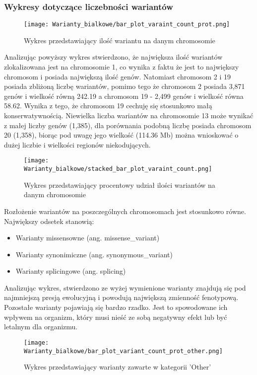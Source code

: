 \documentclass[12pt]{article}
\begin{document}
\subsubsection{Wykresy dotyczące liczebności wariantów}

\begin{figure}[H]
    \texttt{[image: Warianty\_bialkowe/bar\_plot\_varaint\_count\_prot.png]}
    \caption{Wykres przedstawiający ilość wariantu na danym chromosomie}
\end{figure}
\indent
\indent Analizując powyższy wykres stwierdzono, że największa ilość wariantów zlokalizowana jest na chromosomie 1, co wynika z faktu że jest to największy chromosom i posiada największą ilość genów. Natomiast chromosom 2 i 19 posiada zbliżoną liczbę wariantów, pomimo tego że chromosom 2 posiada 3,871 genów i wielkość równą 242.19 a chromosom 19 - 2,499 genów i wielkość równa 58.62. Wynika z tego, że chromosom 19 cechuję się stosunkowo małą konserwatywnością. Niewielka liczba wariantów na chromosomie 13 może wynikać z małej liczby genów (1,385), dla porównania podobną liczbę posiada chromosom 20 (1,358), biorąc pod uwagę jego wielkość (114.36 Mb) można wnioskować o dużej liczbie i wielkości regionów niekodujących. 

\begin{figure}[H]
    \texttt{[image: Warianty\_bialkowe/stacked\_bar\_plot\_varaint\_count.png]}
    \caption{Wykres przedstawiający procentowy udział ilości wariantów na danym chromosomie}
\end{figure}
\indent
\indent Rozłożenie wariantów na poszczególnych chromosomach jest stosunkowo równe. Największy odsetek stanowią: 
\begin{itemize}
    \item Warianty missensowne (ang. missense\_variant)
    \item Warianty synonimiczne (ang. synonymous\_variant)
    \item Warianty splicingowe (ang. splicing)
\end{itemize}
Analizując wykres, stwierdzono ze wyżej wymienione warianty znajdują się pod najmniejszą presją ewolucyjną i powodują największą zmienność fenotypową. Pozostałe warianty pojawiają się bardzo rzadko. Jest to spowodowane ich wpływem na organizm, który musi nieść ze sobą negatywny efekt lub być letalnym dla organizmu. 
\begin{figure}[H]
    \texttt{[image: Warianty\_bialkowe/bar\_plot\_variant\_count\_prot\_other.png]}
    \caption{Wykres przedstawiający warianty zawarte w kategorii 'Other'}
\end{figure}
\end{document}
